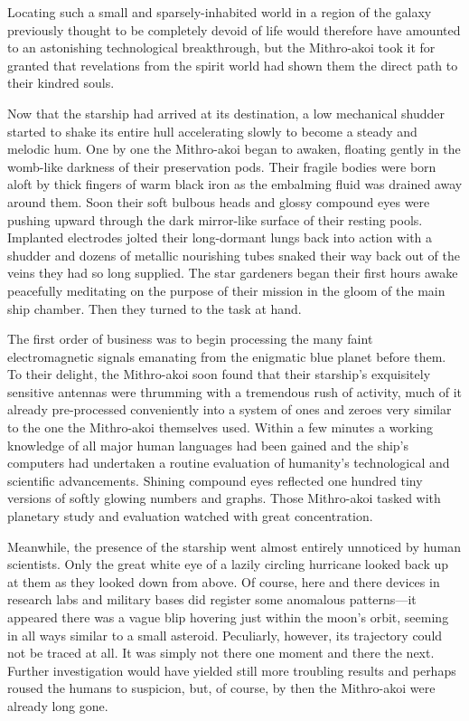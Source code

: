 \documentclass[12pt]{article}
\begin{document}
Locating such a small and sparsely-inhabited world in a region of the galaxy previously thought to be completely devoid of life would therefore have amounted to an astonishing technological breakthrough, 
but the Mithro-akoi took it for granted that revelations from the spirit world had shown them the direct path to their kindred souls.

Now that the starship had arrived at its destination, a low mechanical shudder started to shake its entire hull
accelerating slowly to become a steady and melodic hum.
One by one the Mithro-akoi began to awaken,
floating gently in the womb-like darkness of their preservation pods.
Their fragile bodies were born aloft by thick fingers of warm black iron as the embalming fluid was drained away around them.
Soon their soft bulbous heads and glossy compound eyes were pushing upward through the dark mirror-like surface of their resting pools.
Implanted electrodes jolted their long-dormant lungs back into action with a shudder and dozens of metallic nourishing tubes snaked their way back out of the veins they had so long supplied.
The star gardeners began their first hours awake peacefully meditating on the purpose of their mission in the gloom of the main ship chamber.
Then they turned to the task at hand.

The first order of business was to begin processing the many faint electromagnetic signals emanating from the enigmatic blue planet before them.
To their delight, the Mithro-akoi soon found that their starship's exquisitely sensitive antennas were thrumming with a tremendous rush of activity,
much of it already pre-processed conveniently into a system of ones and zeroes very similar to the one the Mithro-akoi themselves used.
Within a few minutes a working knowledge of all major human languages had been gained and the ship's computers had undertaken a routine evaluation of humanity's technological and scientific advancements.
Shining compound eyes reflected one hundred tiny versions of softly glowing numbers and graphs. 
Those Mithro-akoi tasked with planetary study and evaluation watched with great concentration.

Meanwhile, the presence of the starship went almost entirely unnoticed by human scientists.
Only the great white eye of a lazily circling hurricane looked back up at them as they looked down from above.
Of course, here and there devices in research labs and military bases did register some anomalous patterns---it appeared there was a vague blip hovering just within the moon's orbit, 
seeming in all ways similar to a small asteroid. 
Peculiarly, however, its trajectory could not be traced at all.
It was simply not there one moment and there the next.
Further investigation would have yielded still more troubling results
and perhaps roused the humans to suspicion, 
but, of course, by then the Mithro-akoi were already long gone.
\end{document}
